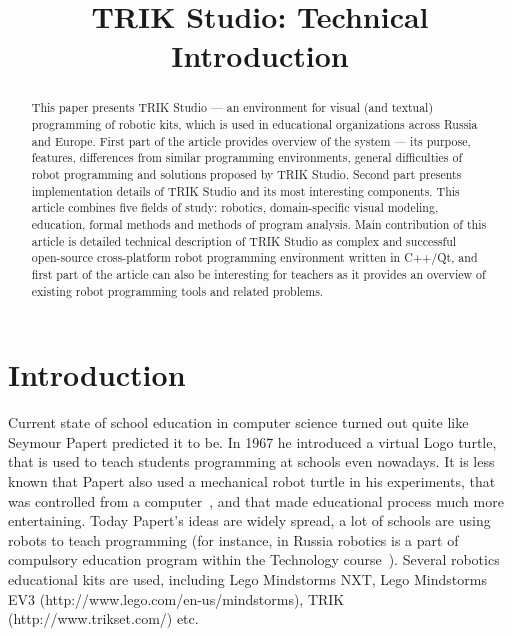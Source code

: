 \documentclass[conference]{IEEEtran}
\begin{document}
\title{TRIK Studio: Technical Introduction}
\date{}%

\author{
\and
\and
}

\maketitle

\begin{abstract}
This paper presents TRIK Studio --- an environment for visual (and textual) programming of robotic kits, which is used in educational organizations across Russia and Europe. First part of the article provides overview of the system --- its purpose, features, differences from similar programming environments, general difficulties of robot programming and solutions proposed by TRIK Studio. Second part presents implementation details of TRIK Studio and its most interesting components. This article combines five fields of study: robotics, domain-specific visual modeling, education, formal methods and methods of program analysis. Main contribution of this article is detailed technical description of TRIK Studio as complex and successful open-source cross-platform robot programming environment written in C++/Qt, and first part of the article can also be interesting for teachers as it provides an overview of existing robot programming tools and related problems.
\end{abstract}

\section{Introduction}
\label{chapter:intro}
Current state of school education in computer science turned out quite like Seymour Papert predicted it to be. In 1967 he introduced a virtual Logo turtle, that is used to teach students programming at schools even nowadays. It is less known that Papert also used a mechanical robot turtle in his experiments, that was controlled from a computer~\cite{papert1980mindstorms}, and that made educational process much more entertaining. Today Papert's ideas are widely spread, a lot of schools are using robots to teach programming (for instance, in Russia robotics is a part of compulsory education program within the Technology course~\cite{luchin2016intro}). Several robotics educational kits are used, including Lego Mindstorms NXT, Lego Mindstorms EV3 (http://www.lego.com/en-us/mindstorms), TRIK (http://www.trikset.com/) etc.
\end{document}

